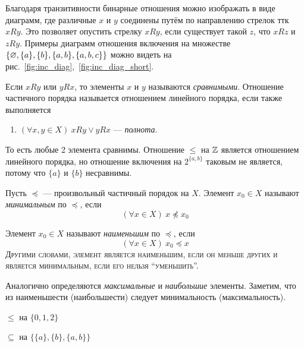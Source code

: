 Благодаря транзитивности бинарные отношения можно изображать в виде диаграмм, где
различные $x$ и $y$ соединены путём по направлению стрелок ттк $xRy$.
Это позволяет опустить стрелку $xRy$, если существует такой $z$, что $xRz$ и $zRy$.
Примеры диаграмм отношения включения на множестве
$\{\varnothing,\{a\},\{b\},\{a,b\}, \{a,b,c\}\}$
можно видеть на рис.~\ref{fig:inc_diag},~\ref{fig:inc_diag_short}.

Если $xRy$ или $yRx$, то элементы $x$ и $y$ называются {\it сравнимыми}.
Отношение частичного порядка называется отношением линейного порядка,
если также выполняется
\begin{enumerate}[resume*]
	\item{}$(\forall x,y\in X)~xRy\lor yRx$ --- {\it полнота}.
\end{enumerate}
То есть любые 2 элемента сравнимы. Отношение $\leq$ на $\mathbb Z$
является отношением линейного порядка,
но отношение включения на $2^{\{a,b\}}$ таковым не является,
потому что $\{a\}$ и $\{b\}$ несравнимы.

Пусть $\preceq$ --- произвольный частичный порядок на $X$.
Элемент $x_0\in X$ называют {\it минимальным} по $\preceq$, если
\[
	(\forall x\in X)~x\npreceq x_0
\]

Элемент $x_0\in X$ называют {\it наименьшим} по $\preceq$, если
\[
	(\forall x\in X)~x_0\preceq x
\]
\textsc{Другими словами, элемент является наименьшим,
если он меньше других и является минимальным, если его нельзя
``уменьшить''.}

Аналогично определяются {\it максимальные} и {\it наибольшие} элементы.
Заметим, что из наименьшести (наибольшести) следует минимальность (максимальность).

\begin{marginfigure}
	\center

	\caption{$\leq$ на $\{0,1,2\}$}\label{fig:less_higher}
\end{marginfigure}

\begin{marginfigure}
	\center

	\caption{$\subseteq$ на $\{\{a\},\{b\},\{a,b\}\}$}\label{fig:min_max}
\end{marginfigure}

